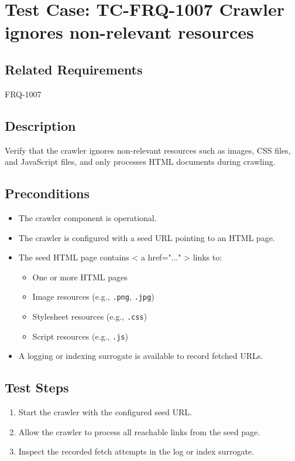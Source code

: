 \documentclass{article}
\begin{document}

\section{Test Case: TC-FRQ-1007 \newline Crawler ignores non-relevant resources}

\subsection*{Related Requirements}
FRQ-1007

\subsection*{Description}
Verify that the crawler ignores non-relevant resources such as images, CSS files, and JavaScript files, 
and only processes HTML documents during crawling.

\subsection*{Preconditions}
\begin{itemize}
  \item The crawler component is operational.
  \item The crawler is configured with a seed URL pointing to an HTML page.
  \item The seed HTML page contains < a href="..." > links to:
    \begin{itemize}
      \item One or more HTML pages
      \item Image resources (e.g., \texttt{.png}, \texttt{.jpg})
      \item Stylesheet resources (e.g., \texttt{.css})
      \item Script resources (e.g., \texttt{.js})
    \end{itemize}
  \item A logging or indexing surrogate is available to record fetched URLs.
\end{itemize}

\subsection*{Test Steps}
\begin{enumerate}
  \item Start the crawler with the configured seed URL.
  \item Allow the crawler to process all reachable links from the seed page.
  \item Inspect the recorded fetch attempts in the log or index surrogate.
\end{enumerate}
\end{document}
